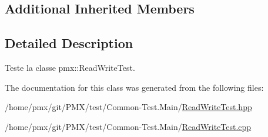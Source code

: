 \subsection*{Additional Inherited Members}


\subsection{Detailed Description}
Teste la classe pmx\+::\+Read\+Write\+Test. 

The documentation for this class was generated from the following files\+:\begin{DoxyCompactItemize}
\item 
/home/pmx/git/\+P\+M\+X/test/\+Common-\/\+Test.\+Main/\hyperlink{ReadWriteTest_8hpp}{Read\+Write\+Test.\+hpp}\item 
/home/pmx/git/\+P\+M\+X/test/\+Common-\/\+Test.\+Main/\hyperlink{ReadWriteTest_8cpp}{Read\+Write\+Test.\+cpp}\end{DoxyCompactItemize}
